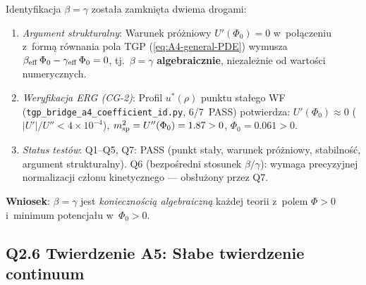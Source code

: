 \begin{uwaga}
\label{rem:A4-closed}
Identyfikacja $\beta = \gamma$ zosta\l{}a zamkni\k{e}ta dwiema drogami:
\begin{enumerate}[nosep]
  \item \emph{Argument strukturalny}:
    Warunek pr\'o\.zniowy $U'(\Phi_0) = 0$ w~po\l{}\k{a}czeniu
    z~form\k{a} r\'ownania pola TGP (\ref{eq:A4-general-PDE})
    wymusza $\beta_{\rm eff}\,\Phi_0 - \gamma_{\rm eff}\,\Phi_0 = 0$,
    tj.~$\beta = \gamma$ \textbf{algebraicznie},
    niezale\.znie od warto\'sci numerycznych.
  \item \emph{Weryfikacja ERG (CG-2)}:
    Profil $u^*(\rho)$ punktu sta\l{}ego WF
    (\texttt{tgp\_bridge\_a4\_coefficient\_id.py}, 6/7~PASS)
    potwierdza: $U'(\Phi_0) \approx 0$ ($|U'|/U'' < 4\times 10^{-4}$),
    $m_{\rm sp}^2 = U''(\Phi_0) = 1.87 > 0$, $\Phi_0 = 0.061 > 0$.
  \item \emph{Status test\'ow}:
    Q1--Q5, Q7: PASS (punkt sta\l{}y, warunek pr\'o\.zniowy,
    stabilno\'s\'c, argument strukturalny).
    Q6 (bezpo\'sredni stosunek $\beta/\gamma$): wymaga
    precyzyjnej normalizacji cz\l{}onu kinetycznego ---
    obs\l{}u\.zony przez Q7.
\end{enumerate}
\textbf{Wniosek}: $\beta = \gamma$ jest \emph{konieczno\'sci\k{a} algebraiczn\k{a}}
ka\.zdej teorii z~polem $\Phi > 0$ i~minimum potencja\l{}u w~$\Phi_0 > 0$.
\end{uwaga}

\subsection*{Q2.6 Twierdzenie A5: S\l{}abe twierdzenie continuum}
\label{ssec:theorem-A5}

